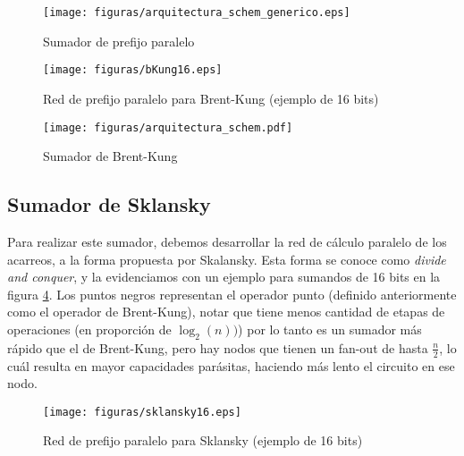 \begin{figure}[h]
  \centering
\texttt{[image: figuras/arquitectura\_schem\_generico.eps]}
  \caption{Sumador de prefijo paralelo}
  \label{fig:ppadder}
\end{figure}

\begin{figure}[h!]
\vspace{-5pt}
  \centering
\texttt{[image: figuras/bKung16.eps]}
  \caption{Red de prefijo paralelo para Brent-Kung (ejemplo de 16 bits)}
\label{bKung16}
\vspace{-10pt}
\end{figure}

\begin{figure}[h]
  \centering
\texttt{[image: figuras/arquitectura\_schem.pdf]}
  \caption{Sumador de Brent-Kung}
  \label{fig:bkungadder}
\end{figure}

\subsection{Sumador de Sklansky}\label{subsec:sklansky}
Para realizar este sumador, debemos desarrollar la red de cálculo paralelo de los acarreos, a la forma propuesta por Skalansky. Esta forma se conoce como \emph{divide and conquer}, y la evidenciamos con un ejemplo para sumandos de 16 bits en la figura \ref{fig:sklansky16}. Los puntos negros representan el operador punto (definido anteriormente como el operador de Brent-Kung), notar que tiene menos cantidad de etapas de operaciones (en proporción de $\log_2(n))$) por lo tanto es un sumador más rápido que el de Brent-Kung, pero hay nodos que tienen un fan-out de hasta $\frac{n}{2}$, lo cuál resulta en mayor capacidades parásitas, haciendo más lento el circuito en ese nodo.

\begin{figure}[h!]
\vspace{-5pt}
  \centering
\texttt{[image: figuras/sklansky16.eps]}
  \caption{Red de prefijo paralelo para Sklansky (ejemplo de 16 bits)}
\label{fig:sklansky16}
\vspace{-10pt}
\end{figure}
